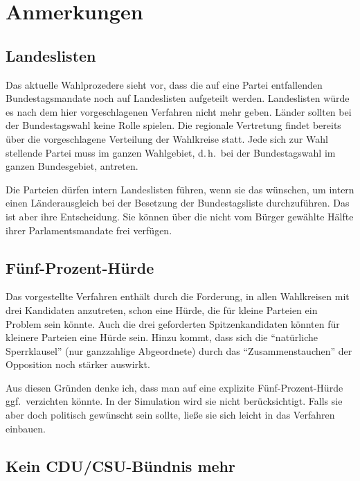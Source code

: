 \section{Anmerkungen}

\subsection{Landeslisten}

Das aktuelle Wahlprozedere sieht vor, dass die auf eine Partei entfallenden Bundestagsmandate
noch auf Landeslisten aufgeteilt werden. Landeslisten würde es nach dem hier vorgeschlagenen
Verfahren nicht mehr geben. Länder sollten bei der Bundestagswahl keine Rolle spielen. Die
regionale Vertretung findet bereits über die vorgeschlagene Verteilung der Wahlkreise statt.
Jede sich zur Wahl stellende Partei muss im ganzen Wahlgebiet, d.\,h.\ bei der Bundestagswahl im
ganzen Bundesgebiet, antreten.

Die Parteien dürfen intern Landeslisten führen, wenn sie das wünschen, um intern einen
Länderausgleich bei der Besetzung der Bundestagsliste durchzuführen. Das ist aber ihre
Entscheidung. Sie können über die nicht vom Bürger gewählte Hälfte ihrer Parlamentsmandate frei
verfügen.

\subsection{Fünf-Prozent-Hürde}

Das vorgestellte Verfahren enthält durch die Forderung, in allen Wahlkreisen mit drei Kandidaten
anzutreten, schon eine Hürde, die für kleine Parteien ein Problem sein könnte. Auch die drei
geforderten Spitzenkandidaten könnten für kleinere Parteien eine Hürde sein. Hinzu kommt, dass
sich die \enquote{natürliche Sperrklausel} (nur ganzzahlige Abgeordnete) durch das
\enquote{Zusammenstauchen} der Opposition noch stärker auswirkt.

Aus diesen Gründen denke ich, dass man auf eine explizite Fünf-Prozent-Hürde ggf.\ verzichten
könnte. In der Simulation wird sie nicht berücksichtigt. Falls sie aber doch politisch gewünscht
sein sollte, ließe sie sich leicht in das Verfahren einbauen.

\subsection{Kein CDU/CSU-Bündnis mehr}


